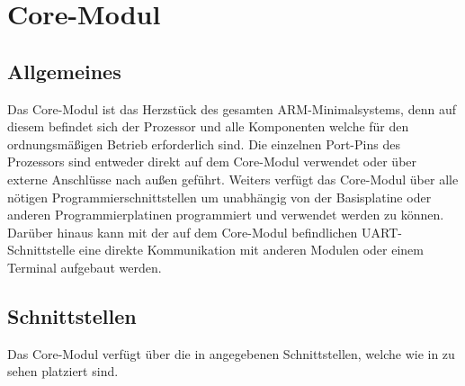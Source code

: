 \section{Core-Modul}
\label{sec:coremodul}


\subsection{Allgemeines}
\label{sec:coremodul-allgemeines}

Das \gls{Core-Modul} ist das Herzstück des gesamten \gls{ARM}-\gls{Minimalsystem}s, denn auf diesem befindet sich der Prozessor und alle Komponenten welche für den ordnungsmäßigen Betrieb erforderlich sind. Die einzelnen Port-Pins des Prozessors sind entweder direkt auf dem \gls{Core-Modul} verwendet oder über externe Anschlüsse nach außen geführt. Weiters verfügt das \gls{Core-Modul} über alle nötigen Programmierschnittstellen um unabhängig von der \gls{Basisplatine} oder anderen Programmierplatinen programmiert und verwendet werden zu können. Darüber hinaus kann mit der auf dem \gls{Core-Modul} befindlichen UART-Schnittstelle eine direkte Kommunikation mit anderen Modulen oder einem Terminal aufgebaut werden.

\subsection{Schnittstellen}
\label{sec:coremodul-schnittstellen}

Das \gls{Core-Modul} verfügt über die in  angegebenen Schnittstellen, welche wie in  zu sehen platziert sind.



